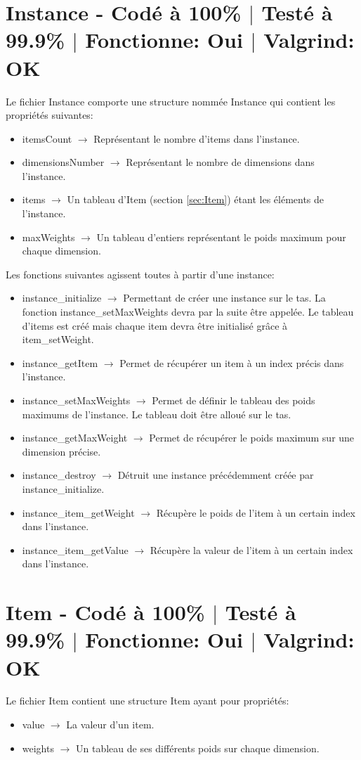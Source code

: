 \documentclass{EPUProjetPeiP}
\newcommand{\comp}[5]{
	\section[#1]{#1 {\small - Codé à #2\% $\vert$ Testé à #3\% $\vert$ Fonctionne: #4 $\vert$ Valgrind: #5}}
}
\begin{document}
\comp{Instance}{100}{99.9}{Oui}{OK}
Le fichier Instance comporte une structure nommée Instance qui contient les propriétés suivantes:
\begin{itemize}
	\item itemsCount $\longrightarrow$ Représentant le nombre d'items dans l'instance.
	\item dimensionsNumber $\longrightarrow$ Représentant le nombre de dimensions dans l'instance.
	\item items $\longrightarrow$ Un tableau d'Item (section \ref{sec:Item}) étant les éléments de l'instance.
	\item maxWeights $\longrightarrow$ Un tableau d'entiers représentant le poids maximum pour chaque dimension.\\
\end{itemize}

Les fonctions suivantes agissent toutes à partir d'une instance:
\begin{itemize}
	\item instance\_initialize $\longrightarrow$ Permettant de créer une instance sur le tas. La fonction instance\_setMaxWeights devra par la suite être appelée. Le tableau d'items est créé mais chaque item devra être initialisé grâce à item\_setWeight.
	\item instance\_getItem $\longrightarrow$ Permet de récupérer un item à un index précis dans l'instance.
	\item instance\_setMaxWeights $\longrightarrow$ Permet de définir le tableau des poids maximums de l'instance. Le tableau doit être alloué sur le tas.
	\item instance\_getMaxWeight $\longrightarrow$ Permet de récupérer le poids maximum sur une dimension précise.
	\item instance\_destroy $\longrightarrow$ Détruit une instance précédemment créée par instance\_initialize.
	\item instance\_item\_getWeight $\longrightarrow$ Récupère le poids de l'item à un certain index dans l'instance.
	\item instance\_item\_getValue $\longrightarrow$ Récupère la valeur de l'item à un certain index dans l'instance.
\end{itemize}

\comp{Item \label{sec:Item}}{100}{99.9}{Oui}{OK}
Le fichier Item contient une structure Item ayant pour propriétés:
\begin{itemize}
	\item value $\longrightarrow$ La valeur d'un item.
	\item weights $\longrightarrow$ Un tableau de ses différents poids sur chaque dimension.\\
\end{itemize}
\end{document}
